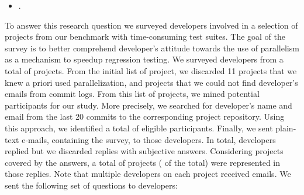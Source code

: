 \begin{itemize}
  \item \numRQAdoptionTwo{}. \textbf{\RQAdoptionTwo{}}
\end{itemize}

To answer this research question we surveyed developers involved in a
selection of projects from our benchmark with time-consuming test
suites.  The goal of the survey is to better comprehend developer's
attitude towards the use of parallelism as a mechanism to speedup
regression testing.  We surveyed developers from a total of
\emailsProjects{} projects.  From the initial list of \numMedLong{}
project, we discarded 11 projects that we knew a priori used
parallelization, and \discartedProjects{} projects that we could not find
developer's emails from commit logs.  From this list of projects, we
mined potential participants for our study.  More precisely, we
searched for developer's name and email from the last 20 commits to
the corresponding project repository.  Using this approach, we
identified a total of \emailsSent{} eligible participants.  Finally,
we sent plain-text e-mails, containing the survey, to those developers.  In
total, \emailsAnswered{} developers replied but we discarded
\emailsFalseAnswers{} replies with subjective answers.  Considering
projects covered by the answers, a total of \emailsProjectsAnswered{}
projects (\percEmailsProjectsAnswered{} of the total) were represented
in those replies.  Note that multiple developers on each project
received emails.  We sent the following set of questions to
developers:

